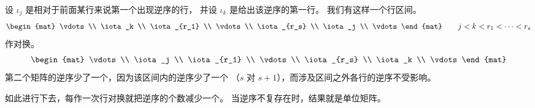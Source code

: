 \begin{exercises}
\begin{answer}
      设 \( \iota_j \) 是相对于前面某行来说第一个出现逆序的行，
      并设 \( \iota_k \) 是给出该逆序的第一行。
      我们有这样一个行区间。
      \begin{equation*}
         \begin{mat}
           \vdots      \\
           \iota_k     \\
           \iota_{r_1} \\
           \vdots      \\
           \iota_{r_s} \\
           \iota_j     \\
           \vdots
         \end{mat}
         \qquad j<k<r_1<\dots <r_s
      \end{equation*}
      作对换。
      \begin{equation*}
         \begin{mat}
           \vdots      \\
           \iota_j     \\
           \iota_{r_1} \\
           \vdots      \\
           \iota_{r_s} \\
           \iota_k     \\
           \vdots
         \end{mat}
      \end{equation*}
      第二个矩阵的逆序少了一个，因为该区间内的逆序少了一个
      （\( s \) 对 \( s+1 \)），而涉及区间之外各行的逆序不受影响。

      如此进行下去，每作一次行对换就把逆序的个数减少一个。
      当逆序不复存在时，结果就是单位矩阵。


\end{answer}
\end{exercises}
